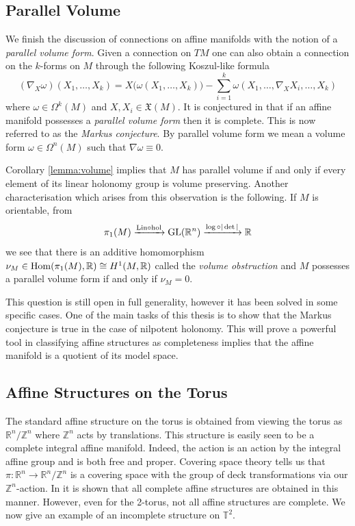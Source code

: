 \subsection{Parallel Volume}

We finish the discussion of connections on affine manifolds with the notion of
a \emph{parallel volume form}. Given a connection on $TM$ one can also obtain a
connection on the $k$-forms on $M$ through the following Koszul-like formula
$$(\nabla_X \omega)(X_1,\dots,X_k) = X\!\bigl(\omega(X_1,\dots,X_k)\bigr) -
    \sum_{i=1}^k \omega(X_1,\dots,\nabla_X X_i,\dots,X_k)$$ where $\omega \in
    \Omega^k(M)$ and $X, X_i \in \mathfrak{X}(M)$. It is conjectured in
\cite{markus1963cosmological} that if an affine manifold possesses a
\emph{parallel volume form} then it is complete. This is now referred to as the
\emph{Markus conjecture}. By parallel volume form we mean a volume form $\omega
    \in \Omega^n(M)$ such that $\nabla \omega \equiv 0$.

Corollary \ref{lemma:volume} implies that $M$ has parallel volume if and only
if every element of its linear holonomy group is volume preserving. Another
characterisation which arises from this observation is the following. If $M$ is
orientable, from $$ \pi_1(M) \xrightarrow{\text{Lin} \circ \text{hol}}
    \mathrm{GL}(\mathbb{R}^n) \xrightarrow{\log \circ|\det| } \mathbb{R} $$ we see that there is an
additive homomorphism $\nu_M \in \operatorname{Hom}(\pi_1(M), \mathbb{R}) \cong H^1(M, \mathbb{R})$ called
the \emph{volume obstruction} and $M$ possesses a parallel volume form if and
only if $\nu_M = 0$.

This question is still open in full generality, however it has been solved in
some specific cases. One of the main tasks of this thesis is to show that the
Markus conjecture is true in the case of nilpotent holonomy. This will prove a
powerful tool in classifying affine structures as completeness implies that the
affine manifold is a quotient of its model space.
\subsection{Affine Structures on the Torus}
The standard affine structure on the torus is obtained from viewing the torus
as $\mathbb{R}^n/\mathbb{Z}^n$ where $\mathbb{Z}^n$ acts by translations. This
structure is easily seen to be a complete integral affine manifold. Indeed, the
action is an action by the integral affine group and is both free and proper.
Covering space theory tells us that $\pi : \mathbb{R}^n \to
    \mathbb{R}^n/\mathbb{Z}^n$ is a covering space with the group of deck
transformations via our $\mathbb{Z}^n$-action. In \cite{MarkusAuslander} it is
shown that all complete affine structures are obtained in this manner. However,
even for the 2-torus, not all affine structures are complete. We now give an
example of an incomplete structure on $\mathbb{T}^2$.

